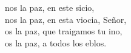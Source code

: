 \begin{cancion}%
	nos la paz, en este sicio,\\
	nos la paz, en esta viocia, Señor,\\
	os la paz, que traigamos tu ino,\\
	os la paz, a todos los eblos.\\
\end{cancion}%
